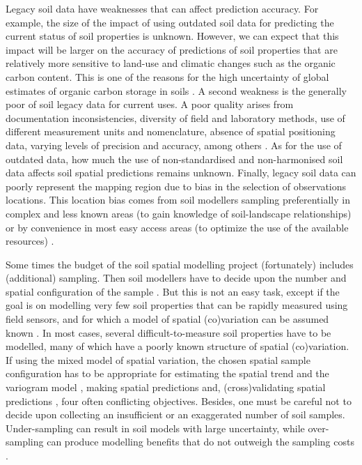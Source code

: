 Legacy soil data have weaknesses that can affect prediction accuracy. For example, the size of the impact of 
using outdated soil data for predicting the current status of soil properties is unknown. However, we can 
expect that this impact will be larger on the accuracy of predictions of soil properties that are relatively 
more sensitive to land-use and climatic changes such as the organic carbon content. This is one of the reasons 
for the high uncertainty of global estimates of organic carbon storage in soils \cite{HenglEtAl2014}. A second 
weakness is the generally poor  of soil legacy data for current uses. A poor quality arises from 
documentation inconsistencies, diversity of field and laboratory methods, use of different measurement units 
and nomenclature, absence of spatial positioning data, varying levels of precision and accuracy, among others 
\cite{RibeiroEtAl2015}. As for the use of outdated data, how much the use of non-standardised and 
non-harmonised soil data affects soil spatial predictions remains unknown. Finally, legacy soil data can poorly
represent the mapping region due to bias in the selection of observations locations. This location bias comes 
from soil modellers sampling preferentially in complex and less known areas (to gain knowledge of 
soil-landscape relationships) or by convenience in most easy access areas (to optimize the use of the available
resources) \cite{Rossiter2000, deGruijterEtAl2006}.

Some times the budget of the soil spatial modelling project (fortunately) includes (additional) sampling. 
Then soil modellers have to decide upon the number and spatial configuration of the sample 
\cite{deGruijterEtAl2006, WebsterEtAl2013}. But this is not an easy task, except if the goal is on modelling 
very few soil properties that can be rapidly measured using field sensors, and for which a model of spatial 
(co)variation can be assumed known \cite{MarchantEtAl2006}. In most cases, several difficult-to-measure soil 
properties have to be modelled, many of which have a poorly known structure of spatial (co)variation. If using 
the mixed model of spatial variation, the chosen spatial sample configuration has to be appropriate for 
estimating the spatial trend \cite{HenglEtAl2003a, MinasnyEtAl2006b} and the variogram model 
\cite{WarrickEtAl1987, WebsterEtAl1992, Lark2002}, making spatial predictions \cite{YfantisEtAl1987, 
WalvoortEtAl2010} and, (cross)validating spatial predictions \cite{BrusEtAl2011}, four often conflicting 
objectives. Besides, one must be careful not to decide upon collecting an insufficient or an exaggerated number
of soil samples. Under-sampling can result in soil models with large uncertainty, while over-sampling can 
produce modelling benefits that do not outweigh the sampling costs \cite{vanGroenigenEtAl1999}.

